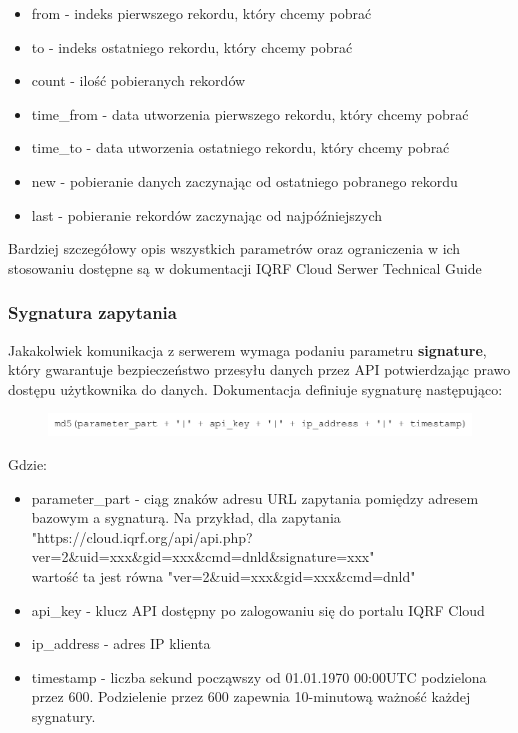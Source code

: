\documentclass[a4paper, 12pt]{article}
\begin{document}
\begin{itemize}
    \item from - indeks pierwszego rekordu, który chcemy pobrać
    \item to - indeks ostatniego rekordu, który chcemy pobrać
    \item count - ilość pobieranych rekordów
    \item time\_from - data utworzenia pierwszego rekordu, który chcemy pobrać 
    \item time\_to - data utworzenia ostatniego rekordu, który chcemy pobrać
    \item new - pobieranie danych zaczynając od ostatniego pobranego rekordu
    \item last - pobieranie rekordów zaczynając od najpóźniejszych
\end{itemize}

Bardziej szczegółowy opis wszystkich parametrów oraz ograniczenia w ich stosowaniu dostępne są w dokumentacji IQRF Cloud Serwer Technical Guide 
\cite{iqrfcloud-guide}

\subsubsection{Sygnatura zapytania}

Jakakolwiek komunikacja z serwerem wymaga podaniu parametru \textbf{signature}, który gwarantuje bezpieczeństwo przesyłu danych przez API 
potwierdzając prawo dostępu użytkownika do danych. Dokumentacja \cite{iqrfcloud-guide} definiuje sygnaturę następująco:

\begin{figure}[H]
    \includegraphics[width=\textwidth]{zdj/md5.png}
\end{figure}

Gdzie: 

\begin{itemize}
    \item parameter\_part - ciąg znaków adresu URL zapytania pomiędzy adresem bazowym a sygnaturą. Na przykład, dla zapytania \\
"https://cloud.iqrf.org/api/api.php?ver=2\&uid=xxx\&gid=xxx\&cmd=dnld\&signature=xxx" \\ 
wartość ta jest równa "ver=2\&uid=xxx\&gid=xxx\&cmd=dnld"
    \item api\_key - klucz API dostępny po zalogowaniu się do portalu IQRF Cloud
    \item ip\_address - adres IP klienta
    \item timestamp - liczba sekund począwszy od 01.01.1970 00:00UTC podzielona przez 600. Podzielenie przez 600 zapewnia 10-minutową
ważność każdej sygnatury.
\end{itemize}
\end{document}
